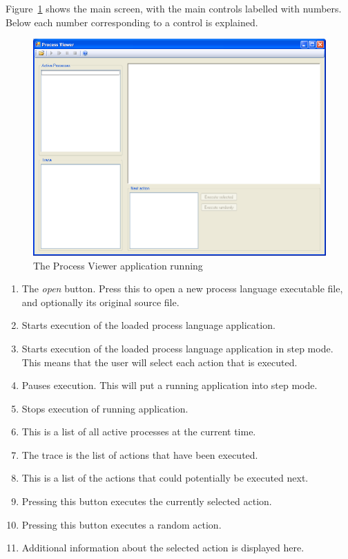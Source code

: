 	Figure~\ref{fig:process_viewer_tutorial} shows the main screen, with the 
	main controls labelled with numbers. Below each number corresponding to a 
	control is explained.

	\begin{figure}[h!]
		\centering
		\includegraphics[scale=0.4]{process_viewer.png}
		\caption{The Process Viewer application running}
		\label{fig:process_viewer_tutorial}
	\end{figure}
	
	\begin{enumerate}
		\item The \textit{open} button. Press this to open a new process language 
		executable file, and optionally its original source file.
		\item Starts execution of the loaded process language application.
		\item Starts execution of the loaded process language application in step 
		mode. This means that the user will select each action that is executed.
		\item Pauses execution. This will put a running application into step mode.
		\item Stops execution of running application.
		\item This is a list of all active processes at the current time.
		\item The trace is the list of actions that have been executed.
		\item This is a list of the actions that could potentially be executed 
		next.
		\item Pressing this button executes the currently selected action.
		\item Pressing this button executes a random action.
		\item Additional information about the selected action is displayed here.
	\end{enumerate}